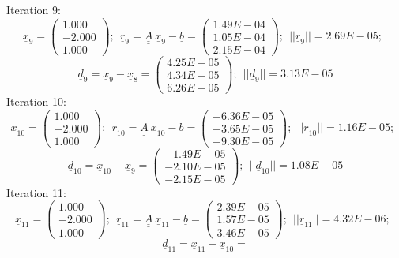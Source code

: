 \documentclass{report}[10pts]
\begin{document}
\begin{small}
\[\]
Iteration 9:
\[
\underline{x}_{9}=
   \begin{pmatrix}
   1.000 \\ -2.000 \\ 1.000
   \end{pmatrix}
;~~
\underline{r}_{9}=
\underline{\underline{A}}~\underline{x}_{9}-
\underline{b}=
   \begin{pmatrix}
   1.49E-04 \\ 1.05E-04 \\ 2.15E-04
   \end{pmatrix}
;~~
||
\underline{r}_{9}
||=
2.69E-05
;~~
\]
\[
\underline{d}_{9}=
\underline{x}_{9}-
\underline{x}_{8}=
   \begin{pmatrix}
   4.25E-05 \\ 4.34E-05 \\ 6.26E-05
   \end{pmatrix}
;~~
||
\underline{d}_{9}
||=
3.13E-05
\]
Iteration 10:
\[
\underline{x}_{10}=
   \begin{pmatrix}
   1.000 \\ -2.000 \\ 1.000
   \end{pmatrix}
;~~
\underline{r}_{10}=
\underline{\underline{A}}~\underline{x}_{10}-
\underline{b}=
   \begin{pmatrix}
   -6.36E-05 \\ -3.65E-05 \\ -9.30E-05
   \end{pmatrix}
;~~
||
\underline{r}_{10}
||=
1.16E-05
;~~
\]
\[
\underline{d}_{10}=
\underline{x}_{10}-
\underline{x}_{9}=
   \begin{pmatrix}
   -1.49E-05 \\ -2.10E-05 \\ -2.15E-05
   \end{pmatrix}
;~~
||
\underline{d}_{10}
||=
1.08E-05
\]
Iteration 11:
\[
\underline{x}_{11}=
   \begin{pmatrix}
   1.000 \\ -2.000 \\ 1.000
   \end{pmatrix}
;~~
\underline{r}_{11}=
\underline{\underline{A}}~\underline{x}_{11}-
\underline{b}=
   \begin{pmatrix}
   2.39E-05 \\ 1.57E-05 \\ 3.46E-05
   \end{pmatrix}
;~~
||
\underline{r}_{11}
||=
4.32E-06
;~~
\]
\[
\underline{d}_{11}=
\underline{x}_{11}-
\underline{x}_{10}=
\]
\end{small}
\end{document}
